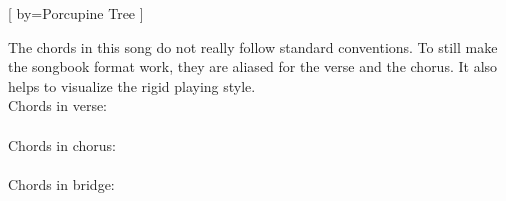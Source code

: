 [
    by={Porcupine Tree}
]

\begin{infotext}
The chords in this song do not really follow standard conventions.
To still make the songbook format work, they are aliased for the verse and the chorus.
It also helps to visualize the rigid playing style.\\[1em]
Chords in verse:\\
\\[1em]
Chords in chorus:\\
\\[1em]
Chords in bridge:\\
\end{infotext}


